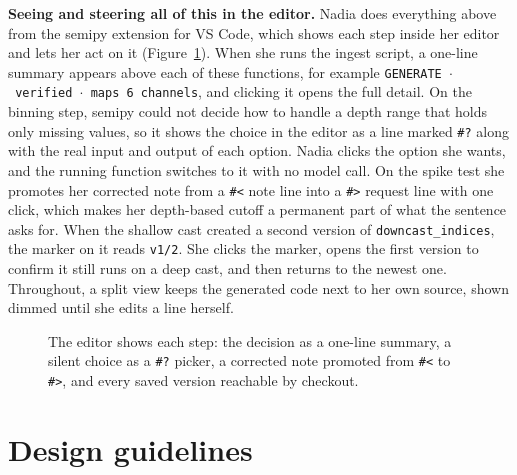 \documentclass[9pt]{extarticle}
\begin{document}
\textbf{Seeing and steering all of this in the editor.} Nadia does everything
above from the semipy extension for VS Code, which shows each step inside her
editor and lets her act on it (Figure~\ref{fig:vscode}). When she runs the
ingest script, a one-line summary appears above each of these functions, for
example \texttt{GENERATE\ $\cdot$\ verified\ $\cdot$\ maps 6 channels}, and
clicking it opens the full detail. On the binning step, semipy could not decide
how to handle a depth range that holds only missing values, so it shows the
choice in the editor as a line marked \verb|#?| along with the real input and
output of each option. Nadia clicks the option she wants, and the running
function switches to it with no model call. On the spike test she promotes her
corrected note from a \verb|#<| note line into a \verb|#>| request line with
one click, which makes her depth-based cutoff a permanent part of what the
sentence asks for. When the shallow cast created a second version of
\verb|downcast_indices|, the marker on it reads \texttt{v1/2}. She clicks the
marker, opens the first version to confirm it still runs on a deep cast, and
then returns to the newest one. Throughout, a split view keeps the generated
code next to her own source, shown dimmed until she edits a line herself.

\begin{figure}[t]
  \centering
  \setlength{\fboxsep}{0pt}%
  \caption{The editor shows each step: the decision as a one-line summary, a
  silent choice as a \texttt{\#?} picker, a corrected note promoted from
  \texttt{\#<} to \texttt{\#>}, and every saved version reachable by checkout.}
  \label{fig:vscode}
\end{figure}

\section{Design guidelines}
\end{document}

